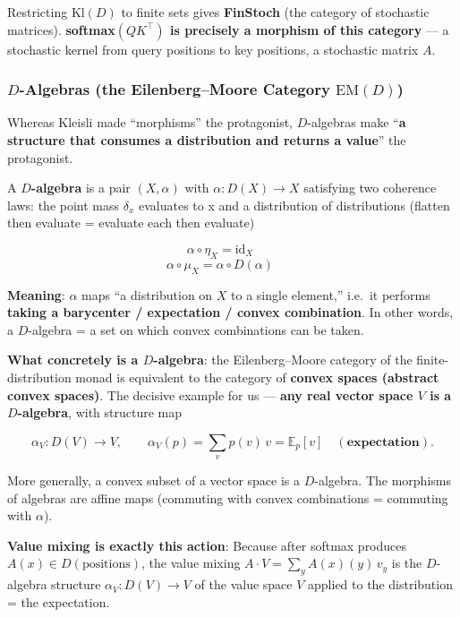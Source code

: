 \documentclass[a4paper,11pt]{article}
\begin{document}
Restricting \(\mathrm{Kl}(D)\) to finite sets gives \textbf{FinStoch} (the category of stochastic matrices). \textbf{softmax\((QK^\top)\) is
precisely a morphism of this category} --- a stochastic kernel from query positions to key positions, a stochastic matrix \(A\).

\hypertarget{d-algebras-the-eilenbergmoore-category-mathrmemd}{%
\subsubsection{\texorpdfstring{\(D\)-Algebras (the Eilenberg--Moore Category \(\mathrm{EM}(D)\))}{D-Algebras (the Eilenberg--Moore Category \textbackslash mathrm\{EM\}(D))}}\label{d-algebras-the-eilenbergmoore-category-mathrmemd}}

Whereas Kleisli made ``morphisms'' the protagonist, \(D\)-algebras make ``\textbf{a structure that consumes a distribution and returns a value}'' the protagonist.

A \textbf{\(D\)-algebra} is a pair \((X,\alpha)\) with
\(\alpha:D(X)\to X\) satisfying two coherence laws:
the point mass $\delta_x$ evaluates to x and a distribution of distributions (flatten then evaluate = evaluate each then evaluate)

\[\alpha\circ\eta_X=\mathrm{id}_X\qquad \]
\[\alpha\circ\mu_X=\alpha\circ D(\alpha)\qquad \]

\textbf{Meaning}: \(\alpha\) maps ``a distribution on \(X\) to a single element,'' i.e.~it performs \textbf{taking a barycenter / expectation / convex combination}. In other words, a \(D\)-algebra = a set on which convex combinations can be taken.

\textbf{What concretely is a \(D\)-algebra}: the Eilenberg--Moore category of the finite-distribution monad is equivalent to the category of \textbf{convex spaces (abstract convex spaces)}\cite{Markov}. The decisive example for us --- \textbf{any real vector space \(V\) is a \(D\)-algebra}, with structure map

\[\alpha_V:D(V)\to V,\qquad \alpha_V(p)=\sum_{v}p(v)\,v=\mathbb E_{p}[v]\quad(\textbf{expectation}).\]

More generally, a convex subset of a vector space is a \(D\)-algebra.
The morphisms of algebras are affine maps (commuting with convex combinations = commuting with \(\alpha\)).

\textbf{Value mixing is exactly this action}: Because after softmax
produces \(A(x)\in D(\text{positions})\), the value mixing \(A\!\cdot\!V=\sum_y A(x)(y)\,v_y\) is the \(D\)-algebra structure
\(\alpha_V:D(V)\to V\) of the value space \(V\) applied to the distribution = the expectation.
\end{document}
